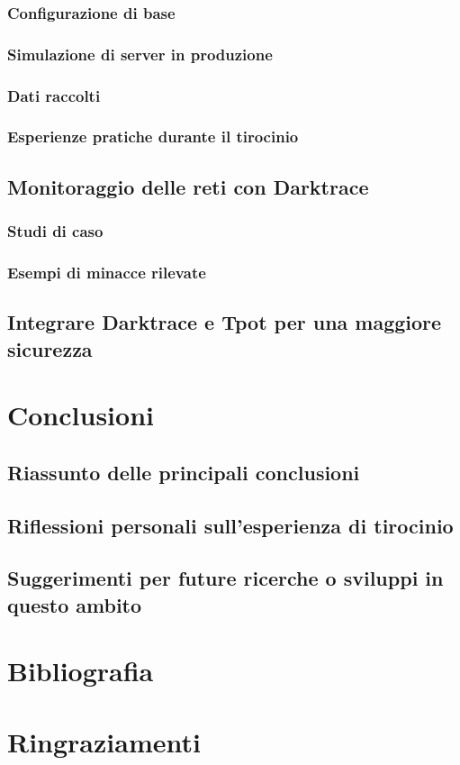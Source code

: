 \documentclass[12pt,a4paper,oneside,onecolumn,openright]{book}
\begin{document}
\subsection{Configurazione di base}
\subsection{Simulazione di server in produzione}
\subsection{Dati raccolti}
\subsection{Esperienze pratiche durante il tirocinio}

\section{Monitoraggio delle reti con Darktrace}
\subsection{Studi di caso}
\subsection{Esempi di minacce rilevate}

\section{Integrare Darktrace e Tpot per una maggiore sicurezza}

\chapter{Conclusioni}
\section{Riassunto delle principali conclusioni}
\section{Riflessioni personali sull'esperienza di tirocinio}
\section{Suggerimenti per future ricerche o sviluppi in questo ambito}

\chapter{Bibliografia}

\chapter{Ringraziamenti}
\end{document}
